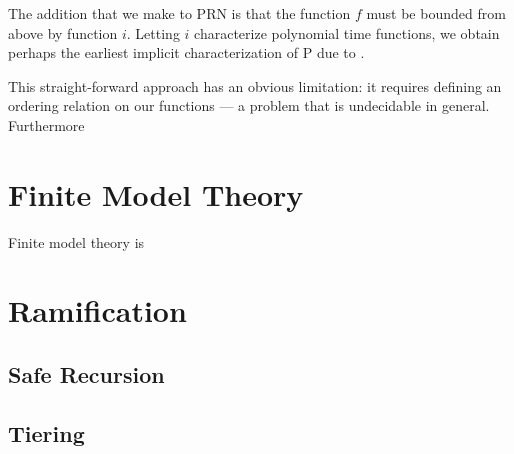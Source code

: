 The addition that we make to PRN is that the function $f$ must be bounded from
above by function $i$. Letting $i$ characterize polynomial time functions, we
obtain perhaps the earliest implicit characterization of P due to
\cite{cobham-1965}.

This straight-forward approach has an obvious limitation: it requires defining
an ordering relation on our functions --- a problem that is undecidable in
general. Furthermore 

\section{Finite Model Theory}

Finite model theory is 

\section{Ramification}

\subsection{Safe Recursion}

\subsection{Tiering}
